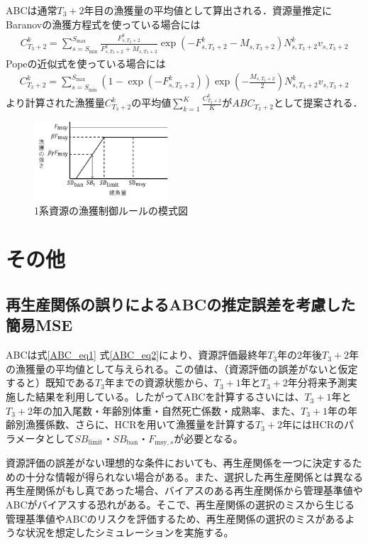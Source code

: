 \documentclass[11pt]{jsarticle}
\begin{document}
ABCは通常$T_{3}+2$年目の漁獲量の平均値として算出される．資源量推定にBaranovの漁獲方程式を使っている場合には
\begin{eqnarray}
  C_{T_3+2}^k=\sum_{s=S_{\mathrm{min}}}^{S_{\mathrm{max}}} \frac{F_{s,T_3+2}^k}{F_{s,T_3+2}^k+M_{s,T_3+2}}
  \exp(- F_{s,T_3+2}^k-M_{s,T_3+2}) N_{s,T_3+2}^k v_{s,T_3+2}
\label{ABC_eq1}
\end{eqnarray}
Popeの近似式を使っている場合には
\begin{eqnarray}
  C_{T_3+2}^k=\sum_{s=S_{\mathrm{min}}}^{S_{\mathrm{max}}} (1-\exp(- F_{s,T_3+2}^k)) \exp(-\frac{M_{s,T_3+2}}{2}) N_{s,T_3+2}^k v_{s,T_3+2}
\label{ABC_eq2}
\end{eqnarray}
より計算された漁獲量$C_{T_3+2}^k$の平均値$\sum_{k=1}^K \frac{C_{T_3+2}^k}{K}$が$ABC_{T_3+2}$として提案される．

\begin{figure}[t]
  \includegraphics[width=5cm]{fig_HCR.png}  
  \caption{
    1系資源の漁獲制御ルールの模式図
  }
  \label{fig_HCR}
\end{figure}

\section{その他}
\subsection{再生産関係の誤りによるABCの推定誤差を考慮した簡易MSE\label{sec:mse}}

ABCは式\ref{ABC_eq1} 式\ref{ABC_eq2}により、資源評価最終年$T_3$年の2年後$T_3+2$年の漁獲量の平均値として与えられる。この値は、（資源評価の誤差がないと仮定すると）既知である$T_3$年までの資源状態から、$T_3+1$年と$T_3+2$年分将来予測実施した結果を利用している。したがってABCを計算するさいには、$T_3+1$年と$T_3+2$年の加入尾数・年齢別体重・自然死亡係数・成熟率、また、$T_3+1$年の年齢別漁獲係数、さらに、HCRを用いて漁獲量を計算する$T_3+2$年にはHCRのパラメータとして$S\!B_{\mathrm{limit}}$・$S\!B_{\mathrm{ban}}$・$F_{\mathrm{msy},s}$が必要となる。

資源評価の誤差がない理想的な条件においても、再生産関係を一つに決定するための十分な情報が得られない場合がある。また、選択した再生産関係とは異なる再生産関係がもし真であった場合、バイアスのある再生産関係から管理基準値やABCがバイアスする恐れがある。そこで、再生産関係の選択のミスから生じる管理基準値やABCのリスクを評価するため、再生産関係の選択のミスがあるような状況を想定したシミュレーションを実施する。
\end{document}
